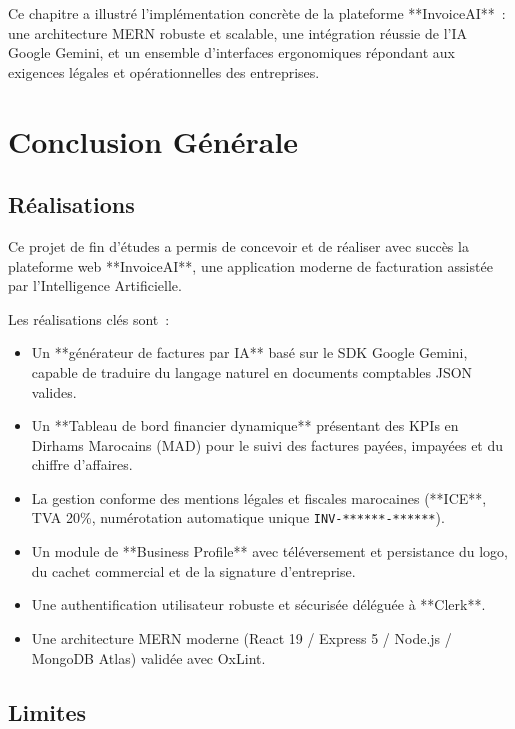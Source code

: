 \documentclass[a4paper,12pt]{extarticle}
\begin{document}
Ce chapitre a illustré l'implémentation concrète de la plateforme **InvoiceAI**~: une architecture MERN robuste et scalable, une intégration réussie de l'IA Google Gemini, et un ensemble d'interfaces ergonomiques répondant aux exigences légales et opérationnelles des entreprises.

\newpage
\section*{Conclusion Générale}

\subsection*{Réalisations}

Ce projet de fin d'études a permis de concevoir et de réaliser avec succès la plateforme web **InvoiceAI**, une application moderne de facturation assistée par l'Intelligence Artificielle.

Les réalisations clés sont~:
\begin{itemize}
  \item Un **générateur de factures par IA** basé sur le SDK Google Gemini, capable de traduire du langage naturel en documents comptables JSON valides.
  \item Un **Tableau de bord financier dynamique** présentant des KPIs en Dirhams Marocains (MAD) pour le suivi des factures payées, impayées et du chiffre d'affaires.
  \item La gestion conforme des mentions légales et fiscales marocaines (**ICE**, TVA 20\%, numérotation automatique unique \texttt{INV-******-******}).
  \item Un module de **Business Profile** avec téléversement et persistance du logo, du cachet commercial et de la signature d'entreprise.
  \item Une authentification utilisateur robuste et sécurisée déléguée à **Clerk**.
  \item Une architecture MERN moderne (React 19 / Express 5 / Node.js / MongoDB Atlas) validée avec OxLint.
\end{itemize}

\subsection*{Limites}
\end{document}
